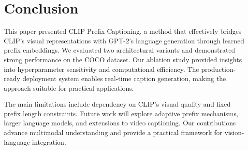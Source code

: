 \documentclass[runningheads]{llncs}
\begin{document}
\section{Conclusion}

This paper presented CLIP Prefix Captioning, a method that effectively bridges CLIP's visual representations with GPT-2's language generation through learned prefix embeddings. We evaluated two architectural variants and demonstrated strong performance on the COCO dataset. Our ablation study provided insights into hyperparameter sensitivity and computational efficiency. The production-ready deployment system enables real-time caption generation, making the approach suitable for practical applications.

The main limitations include dependency on CLIP's visual quality and fixed prefix length constraints. Future work will explore adaptive prefix mechanisms, larger language models, and extensions to video captioning. Our contributions advance multimodal understanding and provide a practical framework for vision-language integration.
\end{document}
